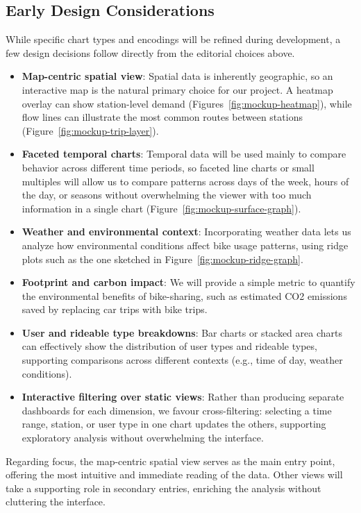 \subsection{Early Design Considerations}
While specific chart types and encodings will be refined during development, a few design decisions follow directly from the editorial choices above.
\begin{itemize}
  \item \textbf{Map-centric spatial view}: Spatial data is inherently geographic, so an interactive map is the natural primary choice for our project.
  A heatmap overlay can show station-level demand (Figures~\ref{fig:mockup-heatmap}), while flow lines can illustrate the most common routes between stations (Figure~\ref{fig:mockup-trip-layer}).
  \item \textbf{Faceted temporal charts}: Temporal data will be used mainly to compare behavior across different time periods, so faceted line charts or 
  small multiples will allow us to compare patterns across days of the week, hours of the day, or seasons without overwhelming the viewer with too much information in a single chart (Figure~\ref{fig:mockup-surface-graph}).
  \item \textbf{Weather and environmental context}: Incorporating weather data lets us analyze how environmental conditions affect bike usage patterns, using ridge plots such as the one sketched in Figure~\ref{fig:mockup-ridge-graph}.
  \item \textbf{Footprint and carbon impact}: We will provide a simple metric to quantify the environmental benefits of bike-sharing, such as estimated CO2 emissions saved by replacing car trips with bike trips.
  \item \textbf{User and rideable type breakdowns}: Bar charts or stacked area charts can effectively show the distribution of user types and rideable types, supporting comparisons across different contexts (e.g., time of day, weather conditions).
  \item \textbf{Interactive filtering over static views}: Rather than producing separate dashboards for each dimension, we favour cross-filtering: selecting a time range, station, or user type in one chart updates the others, supporting exploratory analysis without overwhelming the interface.
\end{itemize}
Regarding focus, the map-centric spatial view serves as the main entry point, offering the most intuitive and immediate reading of the data.
Other views will take a supporting role in secondary entries, enriching the analysis without cluttering the interface.

